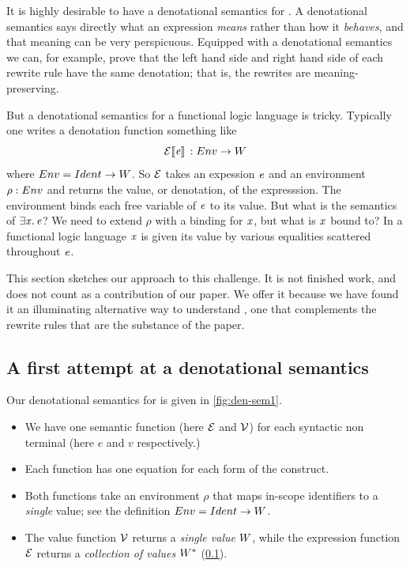 It is highly desirable to have a denotational semantics for \versecalc{}.
A denotational semantics says directly what an expression \emph{means} rather than
how it \emph{behaves}, and that meaning can be very perspicuous.  Equipped with a
denotational semantics we can, for example, prove that the left hand side and
right hand side of each rewrite rule have the same denotation; that is, the rewrites
are meaning-preserving.

But a denotational semantics for a functional logic language is tricky.  Typically one
writes a denotation function something like
$$
\mathcal{E}\llbracket \mathit{e} \rrbracket\,  :  Env \rightarrow W
$$
where $Env = Ident \rightarrow W$.  So $\mathcal{E}$ takes an expession
\ensuremath{\Varid{e}} and an environment $\rho : Env$ and returns the value, or denotation, of the
expresssion.  The environment binds each free variable of \ensuremath{\Varid{e}} to its value.
But what is the semantics of \ensuremath{\exists\Varid{x}.\,\Varid{e}}?   We need to extend $\rho$ with a binding
for \ensuremath{\Varid{x}}, but what is \ensuremath{\Varid{x}} bound to?  In a functional logic language \ensuremath{\Varid{x}} is given
its value by various equalities scattered throughout \ensuremath{\Varid{e}}.

This section sketches our approach to this challenge.  It is not finished work, and
does not count as a contribution of our paper.  We offer it because we have found it
an illuminating alternative way to understand \versecalc{}, one that complements
the rewrite rules that are the substance of the paper.

\subsection{A first attempt at a denotational semantics}  \label{sec:collection}  \label{sec:unification-and-equality}

Our denotational semantics for \versecalc{} is given in \cref{fig:den-sem1}.
\begin{itemize}
\item We have one semantic function (here $\mathcal{E}$ and $\mathcal{V}$) for each syntactic
  non terminal (here $e$ and $v$ respectively.)
\item Each function has one equation for each form of the construct.
\item Both functions take an environment $\rho$ that maps in-scope identifiers to
  a \emph{single} value; see the definition $Env = Ident \rightarrow W$.
\item The value function $\mathcal{V}$ returns a \emph{single value} $W$, while
  the expression function $\mathcal{E}$ returns a \emph{collection of values} $W^{*}$ (\cref{sec:collection}).
\end{itemize}

